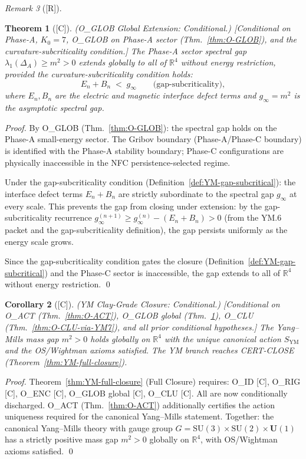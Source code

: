 \documentclass[12pt,oneside]{amsbook}
\theoremstyle{plain}
\newtheorem{theorem}{Theorem}[section]
\newtheorem{corollary}[theorem]{Corollary}
\theoremstyle{definition}
\theoremstyle{remark}
\newtheorem{remark}[theorem]{Remark}
\newcommand{\status}[1]{\textup{[#1]}}
\begin{document}
\begin{remark}[\status{R}]
\begin{theorem}[\status{C}]\label{thm:O-GLOB-global}
\textup{(O\_GLOB Global Extension: Conditional.)}
\textup{[Conditional on Phase-A, $K_0=7$, O\_GLOB on Phase-A
sector (Thm.~\ref{thm:O-GLOB}), and the curvature-subcriticality
condition.]}
The Phase-A sector spectral gap $\lambda_1(\Delta_A) \geq m^2 > 0$
extends globally to all of $\mathbb{R}^4$ without energy restriction,
provided the curvature-subcriticality condition holds:
\[
 E_n + B_n \;<\; g_\infty \qquad \text{(gap-subcriticality)},
\]
where $E_n, B_n$ are the electric and magnetic interface defect
terms and $g_\infty = m^2$ is the asymptotic spectral gap.
\end{theorem}

\begin{proof}
By O\_GLOB (Thm.~\ref{thm:O-GLOB}): the spectral gap holds
on the Phase-A small-energy sector. The Gribov boundary
(Phase-A/Phase-C boundary) is identified with the Phase-A
stability boundary; Phase-C configurations are physically
inaccessible in the NFC persistence-selected regime.

Under the gap-subcriticality condition (Definition~\ref{def:YM-gap-subcritical}):
the interface defect terms $E_n + B_n$ are strictly subordinate
to the spectral gap $g_\infty$ at every scale. This prevents
the gap from closing under extension: by the gap-subcriticality
recurrence $g_\infty^{(n+1)} \geq g_\infty^{(n)} - (E_n + B_n) > 0$
(from the YM.6 packet and the gap-subcriticality definition),
the gap persists uniformly as the energy scale grows.

Since the gap-subcriticality condition gates the closure
(Definition~\ref{def:YM-gap-subcritical}) and the Phase-C sector
is inaccessible, the gap extends to all of $\mathbb{R}^4$
without energy restriction. \qed
\end{proof}

\begin{corollary}[\status{C}]\label{cor:YM-Clay-close}
\textup{(YM Clay-Grade Closure: Conditional.)}
\textup{[Conditional on O\_ACT (Thm.~\ref{thm:O-ACT}),
O\_GLOB global (Thm.~\ref{thm:O-GLOB-global}),
O\_CLU (Thm.~\ref{thm:O-CLU-via-YM7}), and all prior
conditional hypotheses.]}
The Yang--Mills mass gap $m^2 > 0$ holds globally on $\mathbb{R}^4$
with the unique canonical action $S_{\mathrm{YM}}$ and the
OS/Wightman axioms satisfied. The YM branch reaches
CERT-CLOSE (Theorem~\ref{thm:YM-full-closure}).
\end{corollary}

\begin{proof}
Theorem~\ref{thm:YM-full-closure} (Full Closure) requires:
O\_ID [C], O\_RIG [C], O\_ENC [C], O\_GLOB global [C], O\_CLU [C].
All are now conditionally discharged. O\_ACT
(Thm.~\ref{thm:O-ACT}) additionally certifies the action
uniqueness required for the canonical Yang--Mills statement.
Together: the canonical Yang--Mills theory with gauge group
$G = \mathrm{SU}(3)\times\mathrm{SU}(2)\times\mathbf{U}(1)$
has a strictly positive mass gap $m^2 > 0$ globally on
$\mathbb{R}^4$, with OS/Wightman axioms satisfied. \qed
\end{proof}



\end{remark}
\end{document}
